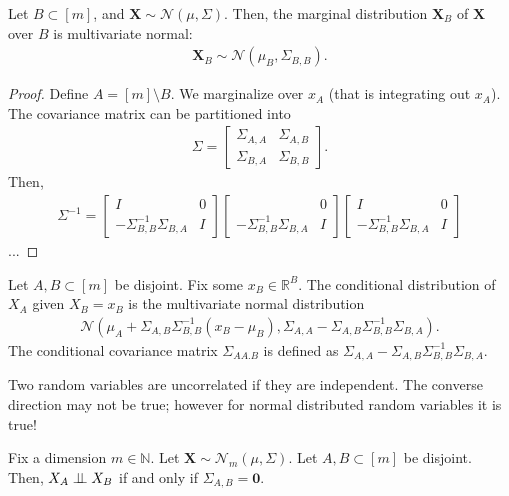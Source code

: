  
\begin{thm}
  Let \(  B \subset [m] \), and \( \mathbf X \sim \mathcal{N}(\mu, \Sigma) \).
  Then, the marginal distribution \( \mathbf X_B \) of \( \mathbf X \) over \( B \) is multivariate normal: 
  \begin{align*}
    \mathbf X_B \sim \mathcal{N}(\mu_B, \Sigma_{B,B}).
  \end{align*}
\end{thm}

\begin{proof}
  Define \( A = [m] \setminus B \).
  We marginalize over \( x_A \) (that is integrating out \( x_A \)).
  The covariance matrix can be partitioned into 
  \begin{align*}
    \Sigma = \begin{bmatrix}
      \Sigma_{A,A} & \Sigma_{A,B} \\
      \Sigma_{B, A} & \Sigma_{B,B}
    \end{bmatrix}.
  \end{align*}
  Then, 
  \begin{align*}
    \Sigma^{-1} = \begin{bmatrix}
      I & 0 \\
      -\Sigma^{-1}_{B,B}\Sigma_{B,A} & I
    \end{bmatrix}
    \begin{bmatrix}
       & 0 \\
      -\Sigma^{-1}_{B,B}\Sigma_{B,A} & I
    \end{bmatrix}
    \begin{bmatrix}
      I & 0 \\
      -\Sigma^{-1}_{B,B}\Sigma_{B,A} & I
    \end{bmatrix}
  \end{align*}
  ...
\end{proof}

\begin{thm}
  Let \( A, B \subset [m] \) be disjoint. Fix some \( x_B \in \mathbb R^B \). The conditional distribution of \( X_A \) given \( X_B = x_B \) is the multivariate normal distribution 
  \begin{align*}
    \mathcal{N}({\mu_{A} + \Sigma_{A,B} \Sigma_{B,B}^{-1}(x_B - \mu_B)}, \Sigma_{A,A} - \Sigma_{A,B}\Sigma_{B,B}^{-1}\Sigma_{B,A}).
  \end{align*}
  The conditional covariance matrix \( \Sigma_{AA.B} \) is defined as \( \Sigma_{A,A} - \Sigma_{A,B}\Sigma_{B,B}^{-1}\Sigma_{B,A} \).
\end{thm}

Two random variables are uncorrelated if they are independent. The converse direction may not be true; however for normal distributed random variables it is true!

\begin{prop}
  Fix a dimension \( m \in \mathbb N \).
  Let \( \mathbf X \sim  \mathcal{N}_{m}(\mu,\Sigma) \). Let \( A, B \subset [m] \) be disjoint. Then, \( X_A \perp \!\!\! \perp X_B \) if and only if \( \Sigma_{A,B} = \mathbf 0\).
\end{prop}